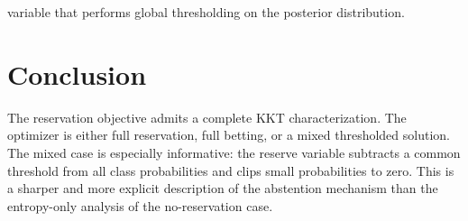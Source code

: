 variable that performs global thresholding on the posterior distribution. \section{Conclusion} The reservation objective admits a complete KKT characterization. The optimizer is either full reservation, full betting, or a mixed thresholded solution. The mixed case is especially informative: the reserve variable subtracts a common threshold from all class probabilities and clips small probabilities to zero. This is a sharper and more explicit description of the abstention mechanism than the entropy-only analysis of the no-reservation case.







